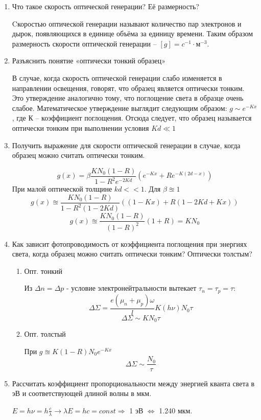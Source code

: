 \documentclass[a4paper,12pt]{report}
\begin{document}
\begin{enumerate}
    \item Что такое скорость оптической генерации? Её размерность? \par 
    Cкоростью оптической генерации называют количество пар электронов и дырок, появляющихся в единице объёма за единицу времени. Таким образом размерность скорости оптической генерации – $[g] = c^{-1} \cdot м^{-3}$.

    \item Разъяснить понятие «оптически тонкий образец» \par 
    В случае, когда скорость оптической генерации слабо изменяется в направлении освещения, говорят, что образец является оптически тонким. Это утверждение аналогично тому, что поглощение света в образце очень слабое. Математическое утверждение выглядит следующим образом:
    $g \sim e^{-Kx}$ , где К – коэффициент поглощения. Отсюда следует, что образец называется оптически тонким при выполнении условия $Kd \ll 1$ 

    \item  Получить выражение для скорости оптической генерации в случае, когда образец можно считать оптически тонким. \par 
    $$g(x) = \beta \frac{KN_0 (1-R)}{1 - R^2 e^{-2Kd}} (e^{-Kx} + Re^{-K(2d-x)})$$
    При малой оптической толщине $kd<<1$. Для $\beta \approxeq 1$
    $$g(x) \approxeq \frac{KN_0(1-R)}{1-R^2(1-2Kd)} ((1-Kx) + R(1-2Kd + Kx))$$
    $$g(x) \approxeq \frac{KN_0 (1-R)}{(1-R)^2} (1+R) = KN_0$$

    \item Как зависит фотопроводимость от коэффициента поглощения при энергиях света, когда образец можно считать оптически тонким? Оптически толстым? \par
    \begin{enumerate}
        \item Опт. тонкий \par 
        Из $\Delta n = \Delta p$ - условие электронейтральности вытекает $\tau_n = \tau_p = \tau$:
        $$\Delta \Sigma = \frac{e(\mu_n + \mu_p) \omega}{l} K(h\nu) N_0 \tau$$
        $$\Delta \Sigma \sim KN_0\tau$$

        \item Опт. толстый \par 
        При $g \approxeq K(1-R)N_0 e^{-Kx}$
        $$\Delta \Sigma \sim \frac{N_0}{\tau}$$
    \end{enumerate}

    \item Рассчитать коэффициент пропорциональности между энергией кванта света в эВ и соответствующей длиной волны в мкм.\par 
    $E = h \nu = h \frac{c}{\lambda} \longrightarrow \lambda E = hc = const \Longrightarrow$ 1 эВ $\Leftrightarrow$ 1.240 мкм.


\end{enumerate}
\end{document}
